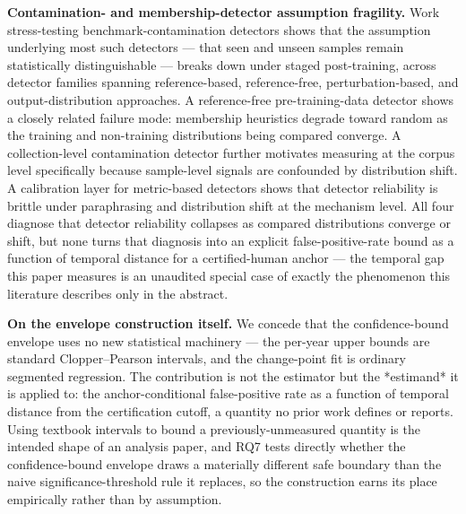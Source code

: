 \documentclass[conference]{IEEEtran}
\begin{document}
\textbf{Contamination- and membership-detector assumption fragility.} Work stress-testing benchmark-contamination detectors \cite{BenchContamFragility} shows that the assumption underlying most such detectors --- that seen and unseen samples remain statistically distinguishable --- breaks down under staged post-training, across detector families spanning reference-based, reference-free, perturbation-based, and output-distribution approaches. A reference-free pre-training-data detector \cite{MinKpp} shows a closely related failure mode: membership heuristics degrade toward random as the training and non-training distributions being compared converge. A collection-level contamination detector \cite{ContamICL} further motivates measuring at the corpus level specifically because sample-level signals are confounded by distribution shift. A calibration layer for metric-based detectors \cite{MarkovCalib} shows that detector reliability is brittle under paraphrasing and distribution shift at the mechanism level. All four diagnose that detector reliability collapses as compared distributions converge or shift, but none turns that diagnosis into an explicit false-positive-rate bound as a function of temporal distance for a certified-human anchor --- the temporal gap this paper measures is an unaudited special case of exactly the phenomenon this literature describes only in the abstract.

\textbf{On the envelope construction itself.} We concede that the confidence-bound envelope uses no new statistical machinery --- the per-year upper bounds are standard Clopper--Pearson intervals, and the change-point fit is ordinary segmented regression. The contribution is not the estimator but the *estimand* it is applied to: the anchor-conditional false-positive rate as a function of temporal distance from the certification cutoff, a quantity no prior work defines or reports. Using textbook intervals to bound a previously-unmeasured quantity is the intended shape of an analysis paper, and RQ7 tests directly whether the confidence-bound envelope draws a materially different safe boundary than the naive significance-threshold rule it replaces, so the construction earns its place empirically rather than by assumption.
\end{document}
